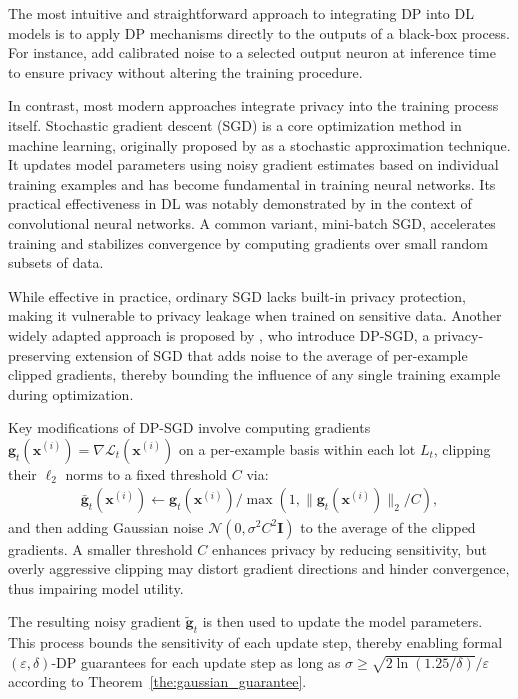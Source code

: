 The most intuitive and straightforward approach to integrating DP into DL models is to apply DP mechanisms directly to the outputs of a black-box process. For instance, \cite{lu2022differentially} add calibrated noise to a selected output neuron at inference time to ensure privacy without altering the training procedure.

In contrast, most modern approaches integrate privacy into the training process itself. Stochastic gradient descent (SGD) is a core optimization method in machine learning, originally proposed by \citet{robbins1951stochastic} as a stochastic approximation technique. It updates model parameters using noisy gradient estimates based on individual training examples and has become fundamental in training neural networks. Its practical effectiveness in DL was notably demonstrated by \citet{lecun1998gradient} in the context of convolutional neural networks. A common variant, mini-batch SGD, accelerates training and stabilizes convergence by computing gradients over small random subsets of data.

While effective in practice, ordinary SGD lacks built-in privacy protection, making it vulnerable to privacy leakage when trained on sensitive data. Another widely adapted approach is proposed by \citet{abadi2016deep}, who introduce DP-SGD, a privacy-preserving extension of SGD that adds noise to the average of per-example clipped gradients, thereby bounding the influence of any single training example during optimization.

Key modifications of DP-SGD involve computing gradients $\mathbf{g}_t(\mathbf{x}^{(i)}) = \nabla \mathcal{L}_t(\mathbf{x}^{(i)})$ on a per-example basis within each lot $L_t$, clipping their $\ell_2$ norms to a fixed threshold $C$ via:
\begin{align} \label{eq:grad_clip}
\bar{\mathbf{g}}_t(\mathbf{x}^{(i)}) \leftarrow \mathbf{g}_t(\mathbf{x}^{(i)}) / \max(1, \|\mathbf{g}_t(\mathbf{x}^{(i)})\|_2 / C),
\end{align}
and then adding Gaussian noise $\mathcal{N}(0, \sigma^2 C^2 \mathbf{I})$ to the average of the clipped gradients. A smaller threshold \(C\) enhances privacy by reducing sensitivity, but overly aggressive clipping may distort gradient directions and hinder convergence, thus impairing model utility. 

The resulting noisy gradient $\tilde{\mathbf{g}}_t$ is then used to update the model parameters. This process bounds the sensitivity of each update step, thereby enabling formal $(\varepsilon, \delta)$-DP guarantees for each update step as long as \(\sigma \geq \sqrt{2 \ln \left( 1.25/\delta \right)}/\varepsilon\) according to Theorem~\ref{the:gaussian_guarantee}.

